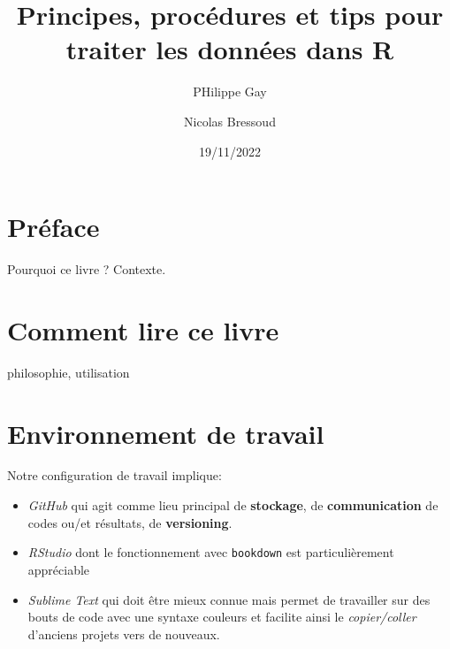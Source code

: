 \documentclass[
  letterpaper,
  DIV=11,
  numbers=noendperiod]{scrreprt}
\title{Principes, procédures et tips pour traiter les données dans R}
\author{PHilippe Gay \and Nicolas Bressoud}
\date{19/11/2022}
\providecommand{\tightlist}{%
  \setlength{\itemsep}{0pt}\setlength{\parskip}{0pt}}\usepackage{longtable,booktabs,array}
\renewcommand*\contentsname{Table des matières}
\newcommand\contentsname{Table des matières}
\begin{document}
\maketitle
\ifdefined\Shaded\renewenvironment{Shaded}{\begin{tcolorbox}[borderline west={3pt}{0pt}{shadecolor}, enhanced, breakable, sharp corners, frame hidden, boxrule=0pt, interior hidden]}{\end{tcolorbox}}\fi

\renewcommand*\contentsname{Table des matières}
{
\hypersetup{linkcolor=}
\setcounter{tocdepth}{2}
\tableofcontents
}

\hypertarget{pruxe9face}{%
\chapter*{Préface}\label{pruxe9face}}


Pourquoi ce livre ? Contexte.


\hypertarget{comment-lire-ce-livre}{%
\chapter*{Comment lire ce livre}\label{comment-lire-ce-livre}}


philosophie, utilisation


\hypertarget{environnement-de-travail}{%
\chapter{Environnement de travail}\label{environnement-de-travail}}

Notre configuration de travail implique:

\begin{itemize}
\tightlist
\item
  \emph{GitHub} qui agit comme lieu principal de \textbf{stockage}, de
  \textbf{communication} de codes ou/et résultats, de
  \textbf{versioning}.
\item
  \emph{RStudio} dont le fonctionnement avec \texttt{bookdown} est
  particulièrement appréciable
\item
  \emph{Sublime Text} qui doit être mieux connue mais permet de
  travailler sur des bouts de code avec une syntaxe couleurs et facilite
  ainsi le \emph{copier/coller} d'anciens projets vers de nouveaux.
\end{itemize}
\end{document}
